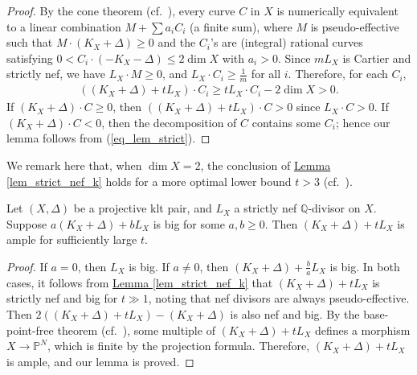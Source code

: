 \begin{proof}
By the cone theorem (cf.~\cite[Theorem 3.7, p.~76]{KM98}), every curve $C$ in $X$ is numerically equivalent to a linear combination 
$M+\sum a_iC_i$ (a finite sum), where  $M$ is  pseudo-effective such that $M\cdot (K_X+\Delta)\geqslant 0$ and the $C_i$'s are (integral) rational curves satisfying $0<C_i\cdot (-K_X-\Delta)\leqslant2\dim X$	 with $a_i>0$.
Since $mL_X$ is Cartier and strictly nef,  we have $L_X\cdot M\geqslant 0$, and $L_X\cdot C_i\geqslant \frac{1}{m}$ for all $i$.
Therefore, for each $C_i$, 
\begin{align}\tag{\dag}\label{eq_lem_strict}
((K_X+\Delta)+tL_X)\cdot C_i\geqslant tL_X\cdot C_i-2\dim X>0.
\end{align}
If $(K_X+\Delta)\cdot C\geqslant 0$, then $((K_X+\Delta)+tL_X)\cdot C>0$ since $L_X\cdot C>0$.
If $(K_X+\Delta)\cdot C<0$, then the decomposition of $C$ contains some $C_i$; hence our lemma follows from (\ref{eq_lem_strict}).
\end{proof}

We remark here that, when $\dim X=2$, the conclusion of  {\hyperref[lem_strict_nef_k]{Lemma  \ref*{lem_strict_nef_k}}} holds for a more optimal lower bound $t>3$ (cf.~\cite[Proposition 3.8]{Fuj12}). 


\begin{lemme}\label{lem-big-ample}
Let $(X,\Delta)$ be a projective klt pair, 
and $L_X$  a strictly nef $\mathbb{Q}$-divisor on $X$.	
Suppose  $a(K_X+\Delta)+bL_X$ is big for some $a,b\geqslant 0$.
Then $(K_X+\Delta)+tL_X$ is ample for sufficiently large $t$. 
\end{lemme}


\begin{proof}
If $a=0$, then $L_X$ is big. %
If $a\neq 0$, then $(K_X+\Delta)+\frac{b}{a}L_X$ is big.
In both cases, it follows from  {\hyperref[lem_strict_nef_k]{Lemma  \ref*{lem_strict_nef_k}}} that $(K_X+\Delta)+tL_X$ is strictly nef and big for $t\gg 1$, noting that nef divisors are always pseudo-effective.
Then $2((K_X+\Delta)+tL_X)-(K_X+\Delta)$ is also nef and big.
By the base-point-free theorem (cf.~\cite[Theorem 3.3, p.~75]{KM98}), some multiple of $(K_X+\Delta)+tL_X$ defines a morphism $X\to\mathbb{P}^N$, which is finite by the projection formula. Therefore, $(K_X+\Delta)+tL_X$ is ample, and our lemma is proved.
\end{proof}


